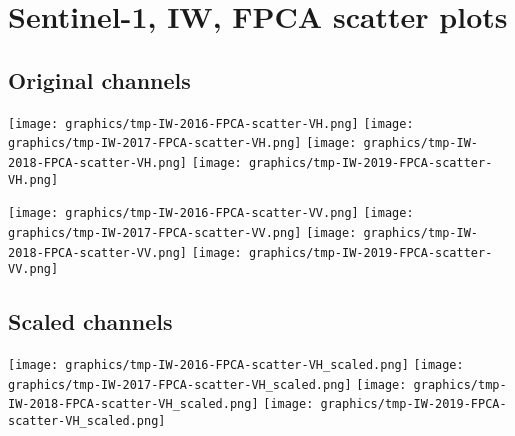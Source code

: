
\section{Sentinel-1, IW, FPCA scatter plots}
\setcounter{theorem}{0}

\renewcommand{\theenumi}{\roman{enumi}}
\renewcommand{\labelenumi}{\textnormal{(\theenumi)}$\;\;$}


\subsection{Original channels}
\label{FPCA-scatter-original}

\begin{center}
\begin{minipage}{7.0in}
\texttt{[image: graphics/tmp-IW-2016-FPCA-scatter-VH.png]}
\quad
\texttt{[image: graphics/tmp-IW-2017-FPCA-scatter-VH.png]}
\vskip 1.0cm
\texttt{[image: graphics/tmp-IW-2018-FPCA-scatter-VH.png]}
\quad
\texttt{[image: graphics/tmp-IW-2019-FPCA-scatter-VH.png]}
\end{minipage}
\end{center}


\clearpage
\begin{center}
\begin{minipage}{7.0in}
\texttt{[image: graphics/tmp-IW-2016-FPCA-scatter-VV.png]}
\quad
\texttt{[image: graphics/tmp-IW-2017-FPCA-scatter-VV.png]}
\vskip 1.0cm
\texttt{[image: graphics/tmp-IW-2018-FPCA-scatter-VV.png]}
\quad
\texttt{[image: graphics/tmp-IW-2019-FPCA-scatter-VV.png]}
\end{minipage}
\end{center}


\clearpage

\subsection{Scaled channels}
\label{FPCA-scatter-scaled}

\begin{center}
\begin{minipage}{7.0in}
\texttt{[image: graphics/tmp-IW-2016-FPCA-scatter-VH\_scaled.png]}
\quad
\texttt{[image: graphics/tmp-IW-2017-FPCA-scatter-VH\_scaled.png]}
\vskip 1.0cm
\texttt{[image: graphics/tmp-IW-2018-FPCA-scatter-VH\_scaled.png]}
\quad
\texttt{[image: graphics/tmp-IW-2019-FPCA-scatter-VH\_scaled.png]}
\end{minipage}
\end{center}

